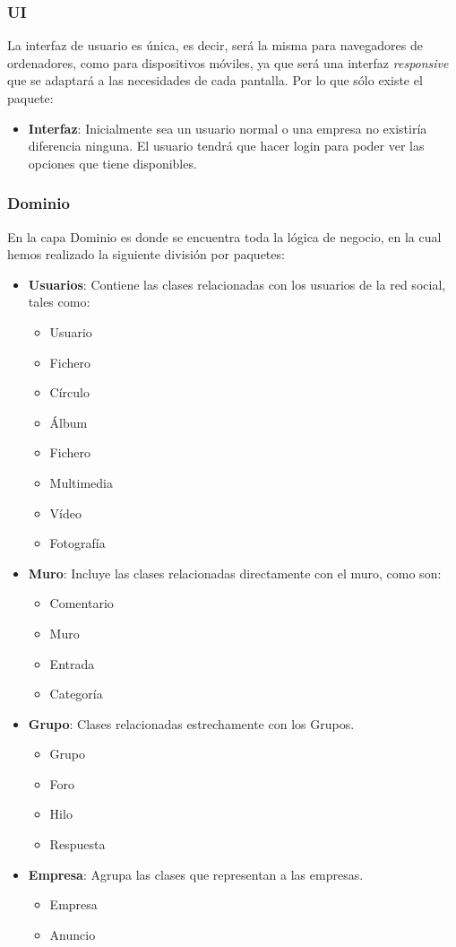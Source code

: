 \documentclass[12pt, a4paper, titlepage]{article}
\begin{document}
\subsubsection{UI}
La interfaz de usuario es única, es decir, será la misma para navegadores de ordenadores, como para dispositivos móviles, ya que será una interfaz \textit{responsive} que se adaptará a las necesidades de cada pantalla. Por lo que sólo existe el paquete: 
	\begin{itemize}
		\item \textbf{Interfaz}: Inicialmente sea un usuario normal o una empresa no existiría diferencia ninguna. El usuario tendrá que hacer login para poder ver las opciones que tiene disponibles.
	\end{itemize}
	
	
\subsubsection{Dominio}

En la capa Dominio es donde se encuentra toda la lógica de negocio, en la cual hemos realizado la siguiente división por paquetes:
\begin{itemize}
	\item \textbf{Usuarios}: Contiene las clases relacionadas con los usuarios de la red social, tales como:
		\begin{itemize}
			\item Usuario
			\item Fichero
			\item Círculo
			\item Álbum
			\item Fichero
			\item Multimedia
			\item Vídeo
			\item Fotografía
		\end{itemize}
	\item \textbf{Muro}: Incluye las clases relacionadas directamente con el muro, como son: 
		\begin{itemize}
			\item Comentario
			\item Muro
			\item Entrada
			\item Categoría
		\end{itemize}
	\item \textbf{Grupo}: Clases relacionadas estrechamente con los Grupos.
		\begin{itemize}
			\item Grupo
			\item Foro
			\item Hilo
			\item Respuesta
		\end{itemize}
	\item \textbf{Empresa}: Agrupa las clases que representan a las empresas.
		\begin{itemize}
			\item Empresa
			\item Anuncio
		\end{itemize}
	
\end{itemize}
\end{document}
